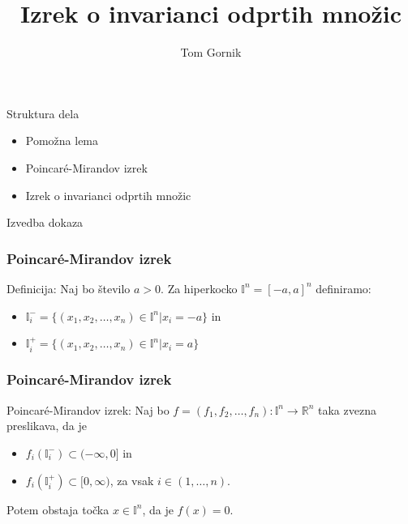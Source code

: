\documentclass[t]{beamer} %
\title{Izrek o invarianci odprtih množic}
\author{Tom Gornik}
\institute{mentor: izr.\ prof.\ dr.\ Jaka Smrekar}
\begin{document}
\begin{frame}
  \maketitle
\end{frame}



\begin{frame}{Struktura dela}
\begin{itemize}
\item Pomožna lema
\item Poincar\'{e}-Mirandov izrek
\item Izrek o invarianci odprtih množic
\end{itemize}
\end{frame}

\begin{frame}{Izvedba dokaza}
\begin{figure}[h!]
\centering

\end{figure}
\end{frame}

\begin{frame}
\frametitle{Poincar\'{e}-Mirandov izrek}
\begin{block}{Definicija:}
Naj bo število $a>0$.
Za hiperkocko $\mathbb{I}^n = [-a, a]^n$ definiramo:
\begin{itemize}
\item $\mathbb{I}_i ^- =\{(x_1, x_2, \dots, x_n) \in \mathbb{I}^n | x_i = -a\}$ in
\item $\mathbb{I}_i ^+ =\{(x_1, x_2, \dots, x_n) \in \mathbb{I}^n | x_i = a\}$
\end{itemize}
\end{block}
\end{frame}

\begin{frame}
\frametitle{Poincar\'{e}-Mirandov izrek}
\begin{block}{Poincar\'{e}-Mirandov izrek:}
Naj bo $f = (f_1, f_2, \dots, f_n) : \mathbb{I}^n \rightarrow \mathbb{R}^n$ taka zvezna preslikava, da je 
\begin{itemize}
\item $f_i (\mathbb{I}_i ^-) \subset (-\infty, 0]$ in
\item $f_i (\mathbb{I}_i ^+) \subset [0, \infty)$, za vsak $i \in (1, \dots, n)$.
\end{itemize}
Potem obstaja točka $x\in \mathbb{I}^n$, da je $f(x) = 0$.
\end{block}
\end{frame}
\end{document}
